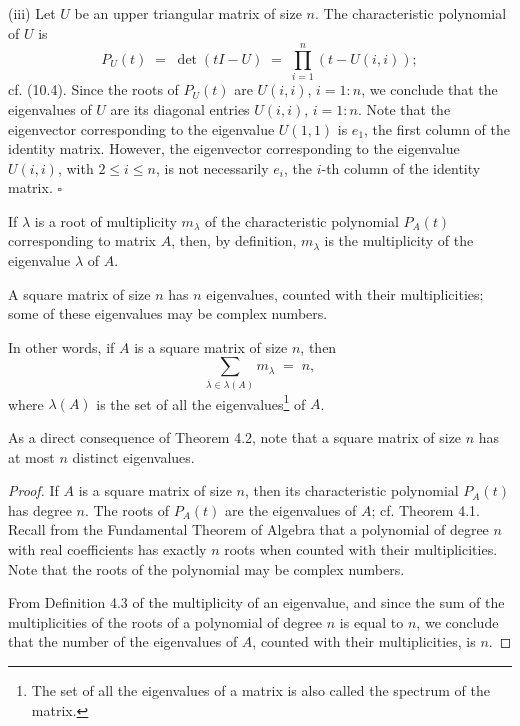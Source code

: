 
(iii) Let $U$ be an upper triangular matrix of size $n$. The characteristic polynomial
of $U$ is
\begin{equation}
P_U(t) \;=\; \det(tI-U) \;=\; \prod_{i=1}^n (t-U(i,i));
\end{equation}
cf. (10.4). Since the roots of $P_U(t)$ are $U(i,i)$, $i = 1:n$, we conclude that the
eigenvalues of $U$ are its diagonal entries $U(i,i)$, $i = 1:n$. Note that the
eigenvector corresponding to the eigenvalue $U(1,1)$ is $e_1$, the first column of the
identity matrix. However, the eigenvector corresponding to the eigenvalue $U(i,i)$, with
$2 \le i \le n$, is not necessarily $e_i$, the $i$-th column of the identity matrix.
\hfill$\square$\par\medskip

\begin{definition}
If $\lambda$ is a root of multiplicity $m_\lambda$ of the characteristic polynomial
$P_A(t)$ corresponding to matrix $A$, then, by definition, $m_\lambda$ is the
multiplicity of the eigenvalue $\lambda$ of $A$.
\end{definition}

\begin{theorem}
A square matrix of size $n$ has $n$ eigenvalues, counted with their multiplicities;
some of these eigenvalues may be complex numbers.

In other words, if $A$ is a square matrix of size $n$, then
\[
\sum_{\lambda \in \lambda(A)} m_\lambda \;=\; n,
\]
where $\lambda(A)$ is the set of all the eigenvalues\footnote{The set of all the
eigenvalues of a matrix is also called the spectrum of the matrix.} of $A$.
\end{theorem}

As a direct consequence of Theorem 4.2, note that a square matrix of size $n$ has at
most $n$ distinct eigenvalues.

\begin{proof}
If $A$ is a square matrix of size $n$, then its characteristic polynomial $P_A(t)$ has
degree $n$. The roots of $P_A(t)$ are the eigenvalues of $A$; cf. Theorem 4.1. Recall
from the Fundamental Theorem of Algebra that a polynomial of degree $n$ with real
coefficients has exactly $n$ roots when counted with their multiplicities. Note that the
roots of the polynomial may be complex numbers.

From Definition 4.3 of the multiplicity of an eigenvalue, and since the sum of the
multiplicities of the roots of a polynomial of degree $n$ is equal to $n$, we conclude
that the number of the eigenvalues of $A$, counted with their multiplicities, is $n$.
\end{proof}

